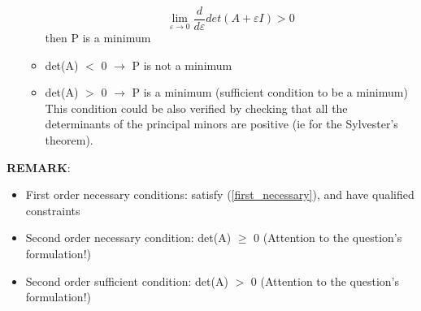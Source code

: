 \documentclass[a4paper,12pt]{article}
\begin{document}
\begin{enumerate}
\begin{itemize}
			\begin{equation}
				\lim_{\varepsilon \to 0} \frac{d}{d\varepsilon}det(A+\varepsilon I) > 0
			\end{equation}
			then P is a minimum
			\item det(A) $<$ 0 $\rightarrow$ P is not a minimum
			\item det(A) $>$ 0 $\rightarrow$ P is a minimum (sufficient condition to be a minimum)\\
			This condition could be also verified by checking that all the determinants of the principal minors are positive (ie for the Sylvester's theorem).
		\end{itemize}
	\end{enumerate}
	\textbf{REMARK}:
	\begin{itemize}
		\item First order necessary conditions: satisfy (\ref{first_necessary}), and have qualified constraints
		\item Second order necessary condition:   det(A) $\ge$ 0 (Attention to the question's formulation!)
		\item Second order sufficient condition:   det(A) $>$ 0 (Attention to the question's formulation!)
	\end{itemize}
\end{document}
